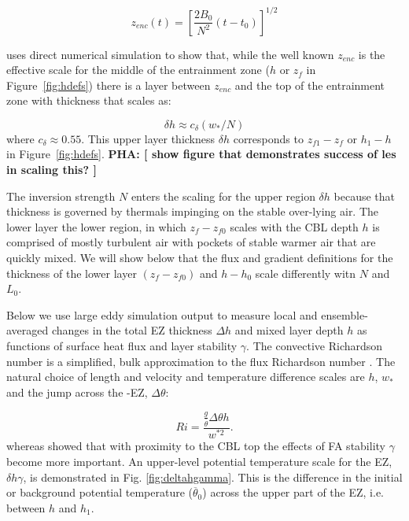 \documentclass[referee]{svjour3}
\newcommand{\remarkpha}[1]{{ \bf PHA:  [ \footnotesize #1 ]}}
\begin{document}
\begin{equation}
  \label{eq:enc}
  z_{enc}(t) = \left [ \frac{2B_0}{N^2} (t - t_0) \right ]^{1/2}
\end{equation}

\cite{Garcia14} uses direct numerical simulation to show that, while the well known $z_{enc}$ is the effective scale for the middle of the entrainment zone ($h$ or $z_f$ in Figure~\ref{fig:hdefs}) there is a layer between $z_{enc}$ and the top of the entrainment zone with thickness that scales as:

\begin{equation}
  \label{eq:upper}
  \delta h \approx c_\delta (w_* / N )
\end{equation}
where $c_\delta \approx 0.55$.  This upper layer thickness $\delta h$ corresponds to  $z_{f1} - z_f$ or $h_1 - h$ in Figure~\ref{fig:hdefs}.
\remarkpha{show figure that demonstrates success of les in scaling this?}

The inversion strength $N$  enters the scaling for the upper region $\delta h$ because that thickness is governed by thermals impinging on the stable over-lying air.  
The lower layer the lower region, in which $z_f - z_{f0}$ scales with the CBL depth $h$  is comprised of mostly turbulent air with pockets of stable warmer air that are quickly mixed. 
We will show below that the flux and gradient definitions for the thickness of the lower layer $(z_{f} - z_{f0})$ and $h - h_0$ scale differently witn $N$ and $L_0$.

Below we use large eddy simulation output to measure local and ensemble-averaged changes in the total EZ thickness $\Delta h$ and mixed layer depth $h$ as functions of surface heat flux and layer stability $\gamma$.  The convective Richardson number is a simplified, bulk approximation to the flux Richardson number \citep{Stull-BLMetIntro}.  The natural choice of length and velocity and temperature difference scales are $h$, $w_{*}$ and the jump across the -EZ, $\Delta \theta$:

\begin{equation}
Ri = \frac{\frac{g}{\overline{\theta}} \Delta \theta h}{w^{*2}}.
\end{equation}
whereas \cite{Sorbjan1} showed that with proximity to the CBL top the effects of FA stability $\gamma$ become more important.  An upper-level potential temperature scale for the EZ, $\delta h \gamma$, is demonstrated in Fig. \ref{fig:deltahgamma}. This is the difference in the initial or background potential temperature ($\overline{\theta}_{0}$) across the upper part of the EZ, i.e. between $h$ and $h_{1}$.\\      
\end{document}
